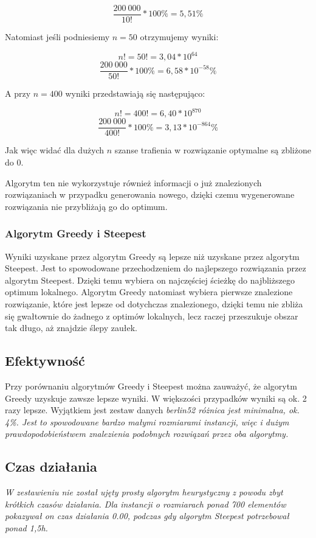 $$ \frac{200~000}{10!} * 100\% = 5,51\%  $$

Natomiast jeśli podniesiemy $ n = 50 $ otrzymujemy wyniki:

$$ n! = 50! = 3,04 * 10^{64} $$
$$ \frac{200~000}{50!} * 100\% = 6,58 * 10^{-58}\%  $$

A przy $ n = 400 $ wyniki przedstawiają się następująco:

$$ n! = 400! = 6,40 * 10^{870} $$
$$ \frac{200~000}{400!} * 100\% = 3,13 * 10^{-864}\%  $$

Jak więc widać dla dużych $ n $ szanse trafienia w rozwiązanie optymalne są zbliżone do $ 0 $.

Algorytm ten nie wykorzystuje również informacji o już znalezionych rozwiązaniach 
w przypadku generowania nowego, dzięki czemu wygenerowane rozwiązania nie przybliżają
go do optimum.

\subsubsection{Algorytm Greedy i Steepest}

Wyniki uzyskane przez algorytm Greedy są lepsze niż uzyskane przez algorytm Steepest. 
Jest to spowodowane przechodzeniem do najlepszego rozwiązania przez algorytm Steepest. 
Dzięki temu wybiera on najczęściej ścieżkę do najbliższego optimum lokalnego. Algorytm
Greedy natomiast wybiera pierwsze znalezione rozwiązanie, które jest lepsze od dotychczas 
znalezionego, dzięki temu nie zbliża się gwałtownie do żadnego z optimów lokalnych, lecz 
raczej przeszukuje obszar tak długo, aż znajdzie ślepy zaułek.

\subsection{Efektywność}

Przy porównaniu algorytmów Greedy i Steepest można zauważyć, że algorytm Greedy uzyskuje 
zawsze lepsze wyniki. W większości przypadków wyniki są ok. 2 razy lepsze. Wyjątkiem jest 
zestaw danych \it berlin52 \rm różnica jest minimalna, ok. 4\%. Jest to spowodowane 
bardzo małymi rozmiarami instancji, więc i dużym prawdopodobieństwem znalezienia podobnych
rozwiązań przez oba algorytmy.

\subsection{Czas działania}

\it
W zestawieniu nie został ujęty prosty algorytm heurystyczny z powodu zbyt krótkich czasów 
działania. Dla instancji o rozmiarach ponad 700 elementów pokazywał on czas działania 0.00, 
podczas gdy algorytm Steepest potrzebował ponad 1,5h.
\rm

